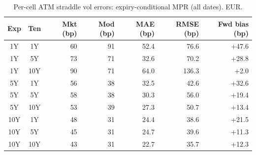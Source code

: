 \begin{table}[H]
\centering
\caption{Per-cell ATM straddle vol errors: expiry-conditional MPR (all dates). EUR.}
\label{tab:expiry_mpr_per_cell_all}
\small
\begin{tabular}{@{}ccrrrrr@{}}
\toprule
\textbf{Exp} & \textbf{Ten} & \textbf{Mkt (bp)} & \textbf{Mod (bp)} & \textbf{MAE (bp)} & \textbf{RMSE (bp)} & \textbf{Fwd bias (bp)} \\
\midrule
  1Y & 1Y & 60 & 91 & 52.4 & 76.6 & +47.6 \\
  1Y & 5Y & 73 & 71 & 32.6 & 70.2 & +28.8 \\
  1Y & 10Y & 90 & 71 & 64.0 & 136.3 & +2.0 \\
  \midrule
  5Y & 1Y & 56 & 38 & 32.5 & 42.6 & +32.6 \\
  5Y & 5Y & 58 & 38 & 30.3 & 56.0 & +19.4 \\
  5Y & 10Y & 53 & 39 & 27.3 & 50.7 & +13.4 \\
  \midrule
  10Y & 1Y & 48 & 31 & 24.4 & 38.6 & +21.5 \\
  10Y & 5Y & 45 & 31 & 24.7 & 39.6 & +11.3 \\
  10Y & 10Y & 43 & 31 & 22.7 & 35.7 & +12.3 \\
\bottomrule
\end{tabular}
\end{table}